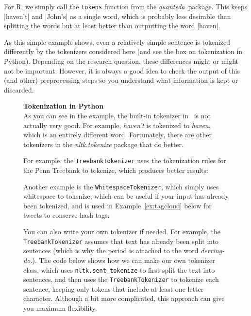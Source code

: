 For R, we simply call the \texttt{tokens} function from the \emph{quanteda}\ package.
This keeps |haven't| and |John's| as a single word, which is probably less desirable than splitting the words
but at least better than outputting the word |haven|.

As this simple example shows, even a relatively simple sentence is tokenized differently by the tokenizers considered here (and see the box on tokenization in Python).
Depending on the research question, these differences might or might not be important.
However, it is always a good idea to check the output of this (and other) preprocessing steps so you understand
what information is kept or discarded.

\begin{figure}
\begin{feature}\textbf{Tokenization in Python}\\
  As you can see in the example, the built-in tokenizer in \sklearn\ is not actually very good.
  For example, \emph{haven't} is tokenized to \emph{haven}, which is an entirely different word.
  Fortunately, there are other tokenizers in the \emph{nltk.tokenize} package that do better.

  For example, the \texttt{TreebankTokenizer} uses the tokenization rules for the Penn Treebank
  to tokenize, which produces better results:


  Another example is the \texttt{WhitespaceTokenizer}, which simply uses whitespace to tokenize,
  which can be useful if your input has already been tokenized,
  and is used in Example~\ref{ex:tagcloud} below for tweets to conserve hash tags.


  You can also write your own tokenizer if needed.
  For example, the \texttt{TreebankTokenizer} assumes that text has already been split into sentences
  (which is why the period is attached to the word \emph{derring-do.}).
  The code below shows how we can make our own tokenizer class,
  which uses \texttt{nltk.sent\_tokenize} to first split the text into sentences,
  and then uses the \texttt{TreebankTokenizer} to tokenize each sentence,
  keeping only tokens that include at least one letter character.
  Although a bit more complicated, this approach can give you maximum flexibility.

\end{feature}
\end{figure}

